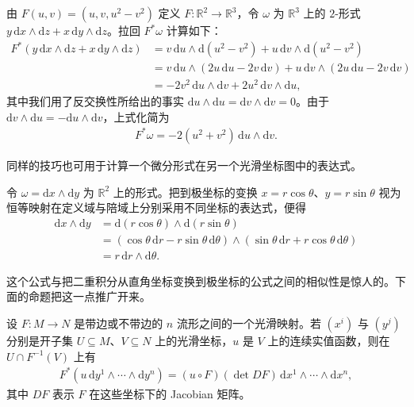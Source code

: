 \documentclass[../../main.tex]{subfiles}
\begin{document}
\begin{example}\label{example:ch14-18pullback}
由 $F(u,v)=(u,v,u^2-v^2)$ 定义 $F:\mathbb{R}^2\to\mathbb{R}^3$，令 $\omega$ 为 $\mathbb{R}^3$ 上的 $2$-形式 $y\,\mathrm{d}x\wedge\mathrm{d}z+x\,\mathrm{d}y\wedge\mathrm{d}z$。拉回 $F^*\omega$ 计算如下：
\begin{align*}
F^*(y\,\mathrm{d}x\wedge\mathrm{d}z+x\,\mathrm{d}y\wedge\mathrm{d}z)
&=v\,\mathrm{d}u\wedge\mathrm{d}(u^2-v^2)+u\,\mathrm{d}v\wedge\mathrm{d}(u^2-v^2)\\
&=v\,\mathrm{d}u\wedge(2u\,\mathrm{d}u-2v\,\mathrm{d}v)+u\,\mathrm{d}v\wedge(2u\,\mathrm{d}u-2v\,\mathrm{d}v)\\
&=-2v^2\,\mathrm{d}u\wedge\mathrm{d}v+2u^2\,\mathrm{d}v\wedge\mathrm{d}u,
\end{align*}
其中我们用了反交换性所给出的事实 $\mathrm{d}u\wedge\mathrm{d}u=\mathrm{d}v\wedge\mathrm{d}v=0$。由于 $\mathrm{d}v\wedge\mathrm{d}u=-\mathrm{d}u\wedge\mathrm{d}v$，上式化简为
\begin{align*}
F^*\omega=-2(u^2+v^2)\,\mathrm{d}u\wedge\mathrm{d}v.
\end{align*}
\end{example}

同样的技巧也可用于计算一个微分形式在另一个光滑坐标图中的表达式。

\begin{example}\label{example:ch14-19polar}
令 $\omega=\mathrm{d}x\wedge\mathrm{d}y$ 为 $\mathbb{R}^2$ 上的形式。把到极坐标的变换 $x=r\cos\theta$、$y=r\sin\theta$ 视为恒等映射在定义域与陪域上分别采用不同坐标的表达式，便得
\begin{align*}
\mathrm{d}x\wedge\mathrm{d}y
&=\mathrm{d}(r\cos\theta)\wedge\mathrm{d}(r\sin\theta)\\
&=(\cos\theta\,\mathrm{d}r-r\sin\theta\,\mathrm{d}\theta)\wedge(\sin\theta\,\mathrm{d}r+r\cos\theta\,\mathrm{d}\theta)\\
&=r\,\mathrm{d}r\wedge\mathrm{d}\theta.
\end{align*}
\end{example}

这个公式与把二重积分从直角坐标变换到极坐标的公式之间的相似性是惊人的。下面的命题把这一点推广开来。

\begin{proposition}[顶次形式的拉回公式]\label{proposition:ch14-pullback-top-degree}
设 $F:M\to N$ 是带边或不带边的 $n$ 流形之间的一个光滑映射。若 $(x^i)$ 与 $(y^j)$ 分别是开子集 $U\subseteq M$、$V\subseteq N$ 上的光滑坐标，$u$ 是 $V$ 上的连续实值函数，则在 $U\cap F^{-1}(V)$ 上有
\begin{align}
F^*(u\,\mathrm{d}y^1\wedge\cdots\wedge\mathrm{d}y^n)
=(u\circ F)(\det DF)\,\mathrm{d}x^1\wedge\cdots\wedge\mathrm{d}x^n,\label{align:ch14-top-pullback}
\end{align}
其中 $DF$ 表示 $F$ 在这些坐标下的 Jacobian 矩阵。
\end{proposition}
\end{document}
